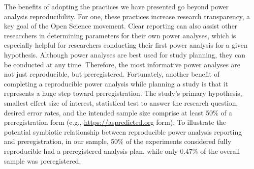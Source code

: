 \documentclass[
  man, donotrepeattitle,mask,floatsintext]{apa7}
\begin{document}
The benefits of adopting the practices we have presented go beyond power analysis reproducibility. For one, these practices increase research transparency, a key goal of the Open Science movement. Clear reporting can also assist other researchers in determining parameters for their own power analyses, which is especially helpful for researchers conducting their first power analysis for a given hypothesis. Although power analyses are best used for study planning, they can be conducted at any time. Therefore, the most informative power analyses are not just reproducible, but preregistered. Fortunately, another benefit of completing a reproducible power analysis while planning a study is that it represents a huge step toward preregistration. The study's primary hypothesis, smallest effect size of interest, statistical test to answer the research question, desired error rates, and the intended sample size comprise at least 50\% of a preregistration form (e.g., \url{https://aspredicted.org} form). To illustrate the potential symbiotic relationship between reproducible power analysis reporting and preregistration, in our sample, 50\% of the experiments considered fully reproducible had a preregistered analysis plan, while only 0.47\% of the overall sample was preregistered.

\clearpage
\end{document}
